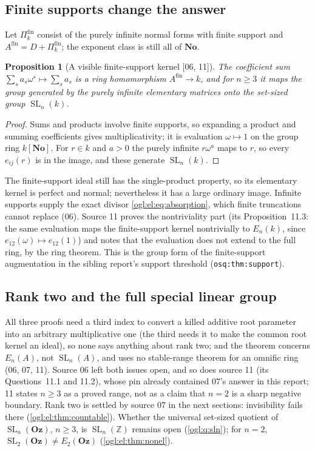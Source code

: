 \documentclass[11pt,oneside]{article}
\numberwithin{equation}{section}
\newtheorem{proposition}[proposition]{Proposition}
\theoremstyle{definition}
\theoremstyle{remark}
\newcommand{\No}{\mathbf{No}}
\newcommand{\Oz}{\mathbf{Oz}}
\newcommand{\Z}{\mathbb Z}
\newcommand{\SL}{\operatorname{SL}}
\newcommand{\src}[1]{\textup{\textsf{\small[#1]}}}
\newcommand{\replabel}[1]{\nolinkurl{#1}}
\begin{document}
\subsection{Finite supports change the answer}

Let $\Pi_k^{\mathrm{fin}}$ consist of the purely infinite normal forms with
finite support and $A^{\mathrm{fin}}=D+\Pi_k^{\mathrm{fin}}$; the exponent class
is still all of $\No$.

\begin{proposition}[A visible finite-support kernel \src{06, 11}]\label{ogl:el:prop:finsupport}
The coefficient sum $\sum_sa_s\omega^s\mapsto\sum_sa_s$ is a ring homomorphism
$A^{\mathrm{fin}}\to k$, and for $n\ge3$ it maps the group generated by the
purely infinite elementary matrices onto the set-sized group $\SL_n(k)$.
\end{proposition}
\begin{proof}
Sums and products involve finite supports, so expanding a product and summing
coefficients gives multiplicativity; it is evaluation $\omega\mapsto1$ on the
group ring $k[\No]$. For $r\in k$ and $a>0$ the purely infinite $r\omega^a$
maps to $r$, so every $e_{ij}(r)$ is in the image, and these generate
$\SL_n(k)$.
\end{proof}

The finite-support ideal still has the single-product property, so its
elementary kernel is perfect and normal; nevertheless it has a large ordinary
image. Infinite supports supply the exact divisor \eqref{ogl:el:eq:absorption},
which finite truncations cannot replace (06). Source 11 proves the
nontriviality part (its Proposition~11.3: the same evaluation maps the
finite-support kernel nontrivially to $E_n(k)$, since $e_{12}(\omega)\mapsto
e_{12}(1)$) and notes that the evaluation does not extend to the full ring, by
the ring theorem. This is the group form of the
finite-support augmentation in the sibling report's support threshold
(\replabel{osq:thm:support}).

\subsection{Rank two and the full special linear group}

All three proofs need a third index to convert a killed additive root parameter
into an arbitrary multiplicative one (the third needs it to make the common root
kernel an ideal), so none says anything about rank two; and the theorem
concerns $E_n(A)$, not $\SL_n(A)$, and uses no stable-range theorem for an
omnific ring (06, 07, 11). Source 06 left both issues open, and so does
source 11 (its Questions~11.1 and 11.2), whose pin already contained 07's
answer in this report; 11 states $n\ge3$ as a proved range, not as a claim
that $n=2$ is a sharp negative boundary. Rank two is
settled by source 07 in the next sections: invisibility fails there
(\cref{ogl:el:thm:countable}). Whether the universal set-sized quotient of
$\SL_n(\Oz)$, $n\ge3$, is $\SL_n(\Z)$ remains open (\cref{ogl:q:sln}); for
$n=2$, $\SL_2(\Oz)\ne E_2(\Oz)$ (\cref{ogl:el:thm:nonel}).
\end{document}
